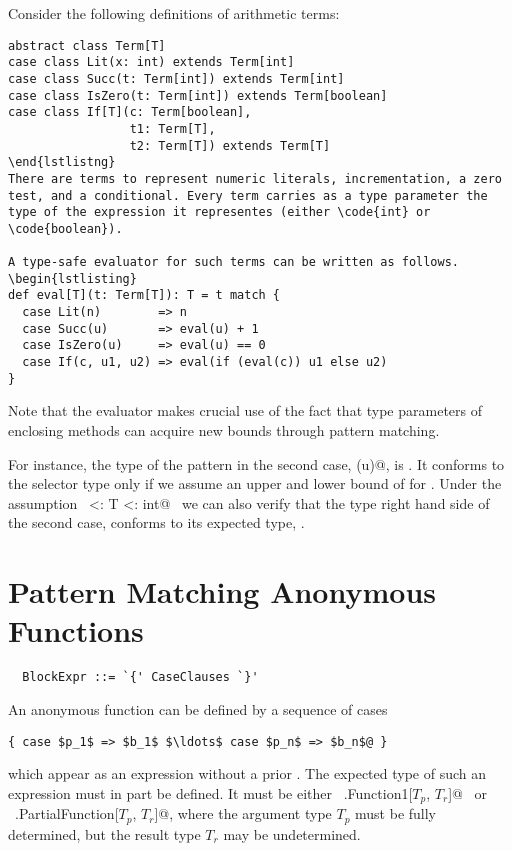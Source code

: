 \example\label{ex:eval}
 Consider the following definitions of arithmetic terms:

\begin{lstlisting}
abstract class Term[T]
case class Lit(x: int) extends Term[int]
case class Succ(t: Term[int]) extends Term[int]
case class IsZero(t: Term[int]) extends Term[boolean]
case class If[T](c: Term[boolean], 
                 t1: Term[T], 
                 t2: Term[T]) extends Term[T]
\end{lstlistng}
There are terms to represent numeric literals, incrementation, a zero
test, and a conditional. Every term carries as a type parameter the
type of the expression it representes (either \code{int} or \code{boolean}).

A type-safe evaluator for such terms can be written as follows.
\begin{lstlisting}
def eval[T](t: Term[T]): T = t match {
  case Lit(n)        => n
  case Succ(u)       => eval(u) + 1
  case IsZero(u)     => eval(u) == 0
  case If(c, u1, u2) => eval(if (eval(c)) u1 else u2)
}
\end{lstlisting}
Note that the evaluator makes crucial use of the fact that type
parameters of enclosing methods can acquire new bounds through pattern
matching.

For instance, the type of the pattern in the second case,
\lstinline@Succ(u)@, is . It conforms to the selector type
 only if we assume an upper and lower bound of  for .
Under the assumption ~\lstinline@int <: T <: int@~ we can also
verify that the type right hand side of the second case, 
conforms to its expected type, .

\section{Pattern Matching Anonymous Functions}

\syntax\begin{lstlisting}
  BlockExpr ::= `{' CaseClauses `}'
\end{lstlisting}

An anonymous function can be defined by a sequence of cases 
\begin{lstlisting}
{ case $p_1$ => $b_1$ $\ldots$ case $p_n$ => $b_n$@ }
\end{lstlisting}
which appear as an expression without a prior .  The
expected type of such an expression must in part be defined. It must
be either ~\lstinline@scala.Function1[$T_p$, $T_r$]@~
or ~\lstinline@scala.PartialFunction[$T_p$, $T_r$]@, where the
argument type $T_p$ must be fully determined, but the result type
$T_r$ may be undetermined.

